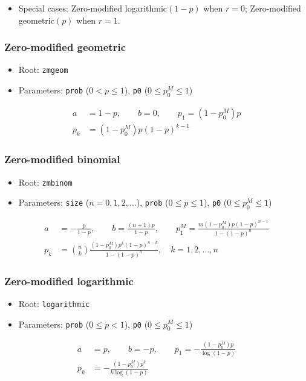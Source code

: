 \documentclass[x11names]{article}
\newcommand{\code}[1]{\texttt{#1}}
\begin{document}
\begin{itemize}
\item Special cases: Zero-modified logarithmic$(1 - p)$ when $r = 0$;
  Zero-modified geometric$(p)$ when $r = 1$.
\end{itemize}

\subsubsection{Zero-modified geometric}

\begin{itemize}
\item Root: \code{zmgeom}
\item Parameters: \code{prob} ($0 < p \leq 1$),
  \code{p0} ($0 \leq p_0^M \leq 1$)
\end{itemize}
\begin{align*}
  a &= 1 - p, \qquad b = 0, \qquad p_1 = (1 - p_0^M) p \\
  p_k &= (1 - p_0^M) p (1 - p)^{k - 1}
\end{align*}

\subsubsection{Zero-modified binomial}

\begin{itemize}
\item Root: \code{zmbinom}
\item Parameters: \code{size} ($n = 0, 1, 2, \dots$),
  \code{prob} ($0 \leq p \leq 1$),
  \code{p0} ($0 \leq p_0^M \leq 1$)
\end{itemize}
\begin{align*}
  a &= -\frac{p}{1 - p}, \qquad b = \frac{(n + 1)p}{1 - p}, \qquad
      p_1^M = \frac{m (1 - p_0^M) p (1 - p)^{n - 1}}{1 - (1 - p)^n} \\
  p_k &= \binom{n}{k} \frac{(1 - p_0^M) p^k (1 - p)^{n - k}}{1 - (1 - p)^n}, \quad
        k = 1, 2, \dots, n
\end{align*}

\subsubsection{Zero-modified logarithmic}

\begin{itemize}
\item Root: \code{logarithmic}
\item Parameters: \code{prob} ($0 \leq p < 1$),
  \code{p0} ($0 \leq p_0^M \leq 1$)
\end{itemize}
\begin{align*}
  a &= p, \qquad b = -p, \qquad
      p_1 = - \frac{(1 - p_0^M) p}{\log (1 - p)} \\
  p_k &= - \frac{(1 - p_0^M) p^k}{k \log (1 - p)}
\end{align*}




\end{document}

